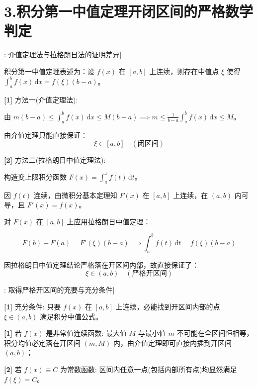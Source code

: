 \documentclass[11pt,a4paper,UTF8]{ctexart}
\begin{document}
\section{3.积分第一中值定理开闭区间的严格数学判定}

\begin{thmbox}[原理[1]: 介值定理法与拉格朗日法的证明差异]

积分第一中值定理表述为：设 $f(x)$ 在 $[a, b]$ 上连续，则存在中值点 $\xi$ 使得 $\int_a^b f(x)\,\mathrm{d}x = f(\xi)(b-a)$。

\textbf{[1]} 方法一(介值定理法):

由 $m(b-a) \leqslant \int_a^b f(x)\,\mathrm{d}x \leqslant M(b-a) \implies m \leqslant \frac{1}{b-a}\int_a^b f(x)\,\mathrm{d}x \leqslant M$。

由介值定理只能直接保证：
\begin{equation*}
\xi \in [a, b] \quad (\text{闭区间})
\end{equation*}


\textbf{[2]} 方法二(拉格朗日中值定理法):

构造变上限积分函数 $F(x) = \int_a^x f(t)\,\mathrm{d}t$。

因 $f(t)$ 连续，由微积分基本定理知 $F(x)$ 在 $[a, b]$ 上连续，在 $(a, b)$ 内可导，且 $F'(x) = f(x)$。

对 $F(x)$ 在 $[a, b]$ 上应用拉格朗日中值定理：


\begin{equation*}
F(b) - F(a) = F'(\xi)(b - a) \implies \int_a^b f(t)\,\mathrm{d}t = f(\xi)(b - a)
\end{equation*}


因拉格朗日中值定理结论严格落在开区间内部，故直接保证了：
\begin{equation*}
\xi \in (a, b) \quad (\text{严格开区间})
\end{equation*}


\end{thmbox}
\begin{thmbox}[定理[1]: 取得严格开区间的充要与充分条件]

\textbf{[1]} 充分条件: 只要 $f(x)$ 在 $[a, b]$ 上连续，必能找到开区间内部的点 $\xi \in (a, b)$ 满足积分中值公式。

\textbf{[1]} 若 $f(x)$ 是非常值连续函数: 最大值 $M$ 与最小值 $m$ 不可能在全区间恒相等，积分均值必定落在开区间 $(m, M)$ 内，由介值定理即可直接内插到开区间 $(a, b)$；

\textbf{[2]} 若 $f(x) \equiv C$ 为常数函数: 区间内任意一点(包括内部所有点)均显然满足 $f(\xi) = C$。

\end{thmbox}
\end{document}
